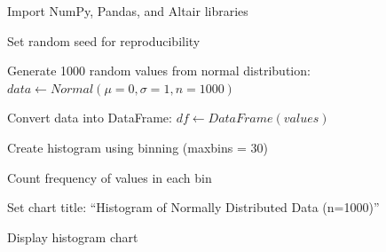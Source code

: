 \begin{algorithm}
\caption{Generate Random Normal Data and Plot Histogram using Altair}
\begin{algorithmic}[1]

\STATE Import NumPy, Pandas, and Altair libraries

\STATE Set random seed for reproducibility

\STATE Generate 1000 random values from normal distribution:
\STATE $data \gets Normal(\mu=0, \sigma=1, n=1000)$

\STATE Convert data into DataFrame:
\STATE $df \gets DataFrame(values)$

\STATE Create histogram using binning (maxbins = 30)

\STATE Count frequency of values in each bin

\STATE Set chart title: ``Histogram of Normally Distributed Data (n=1000)''

\STATE Display histogram chart

\end{algorithmic}
\end{algorithm}